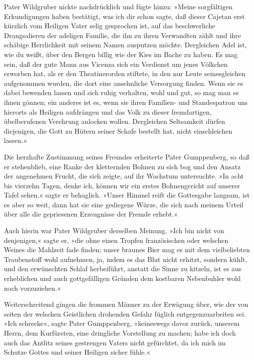 Pater Wildgruber nickte nachdrücklich und fügte hinzu: »Meine
sorgfältigen Erkundigungen haben bestätigt, was ich dir schon
sagte, daß dieser Cajetan erst kürzlich vom Heiligen Vater selig
gesprochen ist, auf das beschwerliche Drangsalieren der adeligen
Familie, die ihn zu ihren Verwandten zählt und ihre schäbige
Herrlichkeit mit seinem Namen ausputzen möchte. Dergleichen Adel
ist, wie du weißt, über den Bergen billig wie der Kies im Bache zu
haben. Es mag sein, daß der gute Mann aus Vicenza sich ein
Verdienst um jenes Völkchen erworben hat, als er den Theatinerorden
stiftete, in den nur Leute seinesgleichen aufgenommen wurden, die
dort eine ansehnliche Versorgung finden. Wenn sie es dabei bewenden
lassen und sich ruhig verhalten, wohl und gut, so mag man es ihnen
gönnen; \pagenum{[97]} ein anderes ist es, wenn sie ihren Familien-
und Standespatron uns hierorts als Heiligen aufdrängen und das Volk
zu dieser fremdartigen, übelberufenen Verehrung anlocken wollen.
Dergleichen Seltsamkeit dürfen diejenigen, die Gott zu Hütern
seiner Schafe bestellt hat, nicht einschleichen lassen.«

Die herzhafte Zustimmung seines Freundes erheiterte Pater
Gumppenberg, so daß er stehenblieb, eine Ranke der kletternden
Bohnen zu sich bog und den Ansatz der angenehmen Frucht, die sich
zeigte, auf ihr Wachstum untersuchte. »In acht bis vierzehn Tagen,
denke ich, können wir ein erstes Bohnengericht auf unserer Tafel
sehen,« sagte er behaglich. »Unser Himmel reift die Gottesgabe
langsam, ist es aber so weit, dann hat sie eine gediegene Würze,
die sich nach meinem Urteil über alle die gepriesenen Erzeugnisse
der Fremde erhebt.«

Auch hierin war Pater Wildgruber derselben Meinung. »Ich bin nicht
von denjenigen,« sagte er, »die ohne einen Tropfen französischen
oder welschen Weines die Mahlzeit fade finden; unser braunes Bier
mag es mit dem vielbeliebten Traubenstoff wohl aufnehmen, ja, indem
es das Blut nicht erhitzt, sondern kühlt, und den erwünschten
Schlaf herbeiführt, anstatt die Sinne zu kitzeln, ist es aus
erheblichen und auch gottgefälligen Gründen dem kostbaren
Nebenbuhler wohl noch vorzuziehen.«

Weiterschreitend gingen die frommen Männer zu der Erwägung über,
wie der von seiten der welschen Geistlichen drohenden Gefahr
füglich entgegenzuarbeiten sei. »Ich schrecke«, sagte Pater
Gumppenberg, »keineswegs davor zurück, unserem Herrn, dem
Kurfürsten, eine dringliche Vorstellung zu machen; habe ich doch
auch das Antlitz seines gestrengen Vaters nicht \pagenum{[98]}
gefürchtet, da ich mich im Schutze Gottes und seiner Heiligen
sicher fühle.«

